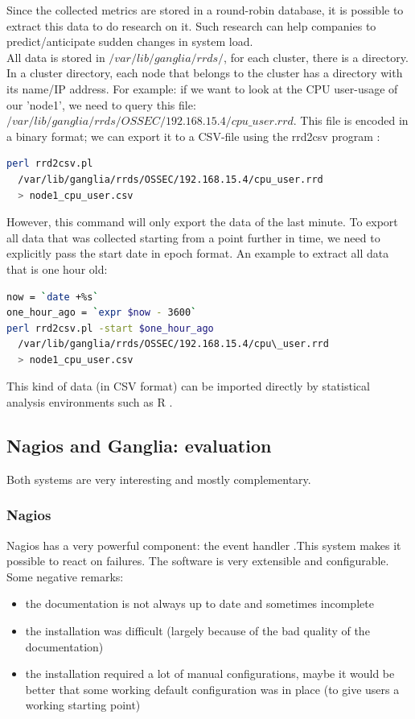 \documentclass[12pt]{report}
\begin{document}
Since the collected metrics are stored in a round-robin database, it is possible to
extract this data to do research on it. Such research can help
companies to predict/anticipate sudden changes in system load.\\

All data is stored in $/var/lib/ganglia/rrds/$, for each cluster,
there is a directory. In a cluster directory, each node that belongs
to the cluster has a directory with its name/IP address.
For example: if we want to look at the CPU user-usage of our 'node1',
we need to query this file:
$/var/lib/ganglia/rrds/OSSEC/192.168.15.4/cpu\_user.rrd$. This file is
encoded in a binary format; we can export it to a CSV-file using the
rrd2csv program \cite{rrd2csv}:
\begin{lstlisting}[language=bash]
perl rrd2csv.pl  
  /var/lib/ganglia/rrds/OSSEC/192.168.15.4/cpu_user.rrd 
  > node1_cpu_user.csv
\end{lstlisting} 

However, this command will only export the data of the last minute. To
export all data that was collected starting from a point further in time, we need to
explicitly pass the start date in epoch format.
An example to extract all data that is one hour old:
\begin{lstlisting}[language=bash]
now = `date +%s`
one_hour_ago = `expr $now - 3600` 
perl rrd2csv.pl -start $one_hour_ago 
  /var/lib/ganglia/rrds/OSSEC/192.168.15.4/cpu\_user.rrd 
  > node1_cpu_user.csv
\end{lstlisting} 

This kind of data (in CSV format) can be imported directly by statistical analysis
environments such as R \cite{r_software}.

\subsection{Nagios and Ganglia: evaluation}
Both systems are very interesting and mostly complementary.
\subsubsection{Nagios}
Nagios has a very powerful component: the event handler .This system makes it
possible to react on failures. The software is very
extensible and configurable.\\
Some negative remarks: 
\begin{itemize}
\item the documentation is not always up to date and sometimes incomplete
\item the installation was difficult (largely
  because of the bad quality of the documentation)
\item the installation required a lot of manual configurations,
  maybe it would be better that some working default configuration was
  in place (to give users a working starting point)
\end{itemize}
\end{document}
